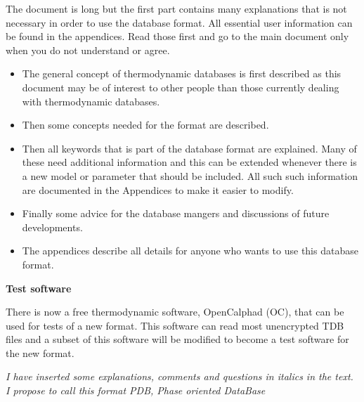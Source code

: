 \documentclass[12pt]{article}
\begin{document}
The document is long but the first part contains many explanations
that is not necessary in order to use the database format.  All
essential user information can be found in the appendices.  Read those
first and go to the main document only when you do not understand or
agree.

\begin{itemize}
\item The general concept of thermodynamic databases is first
  described as this document may be of interest to other people than
  those currently dealing with thermodynamic databases.

\item Then some concepts needed for the format are described.

\item Then all keywords that is part of the database format are
  explained.  Many of these need additional information and this can
  be extended whenever there is a new model or parameter that should
  be included.  All such such information are documented in the
  Appendices to make it easier to modify.

\item Finally some advice for the database mangers and discussions of
  future developments.

\item The appendices describe all details for anyone who wants to use
  this database format.
\end{itemize}

\bigskip

{\bf Test software}

\bigskip

There is now a free thermodynamic software, OpenCalphad (OC), that can
be used for tests of a new format.  This software can read most
unencrypted TDB files and a subset of this software will be modified
to become a test software for the new format.

\vspace{10mm}

{\em I have inserted some explanations, comments and questions in
  italics in the text.  I propose to call this format PDB, Phase
  oriented DataBase}

\newpage
\end{document}
